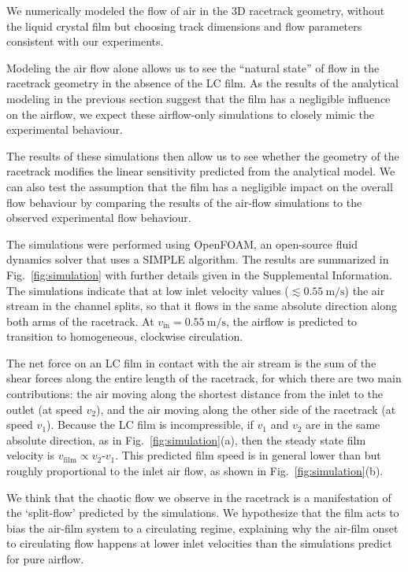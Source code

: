 \documentclass[aagreenthesis]{subfiles}
\begin{document}
We numerically
modeled the flow of air in the 3D racetrack geometry, without the liquid crystal
film but choosing track dimensions and flow parameters consistent with our
experiments.

  Modeling the air flow alone allows us to see the
     ``natural state'' of flow in the racetrack geometry in the absence of the
     LC film. As the results of the analytical modeling in the previous section
     suggest that the film has a negligible influence on the airflow,
     we expect these airflow-only simulations to closely mimic the experimental
     behaviour. 
     
     The results of these simulations then allow us to see whether the
     geometry of the racetrack modifies the linear sensitivity predicted from
     the analytical model. We can also test the
     assumption that the film has a negligible impact on the overall flow
     behaviour by comparing the results of the air-flow simulations to the observed experimental flow behaviour. 

The simulations were performed using OpenFOAM, an open-source fluid dynamics
solver that uses a SIMPLE
algorithm\cite{Wellertensorialapproachcomputational1998}.
The results are summarized in Fig.~\ref{fig:simulation} with further details given in
the Supplemental Information.
The simulations indicate that at low inlet velocity values ($\lesssim
\SI[per-mode=symbol]{0.55}{\meter\per\second}$) the air stream in the channel splits, so that it flows
in the same absolute direction along both arms of the racetrack.
At $v_\text{in}=\SI[per-mode=symbol]{0.55}{\meter\per\second}$, the airflow is predicted to
transition to homogeneous, clockwise circulation.

The net force on an LC film in contact with the air stream is the sum of the shear forces along the entire
length of the racetrack, for which there are two main contributions:
the air moving along the shortest distance from the inlet to the
outlet (at speed $v_2$), and the air moving along the other side of the
racetrack (at speed $v_1$). Because the LC film is incompressible, if
$v_1$ and $v_2$ are in the same absolute direction, as in Fig.~\ref{fig:simulation}(a), then the steady
state film velocity is $v_\text{film}\propto v_2$-$v_1$.
This predicted film speed is in general lower than but roughly proportional to the inlet air flow, as shown in
Fig.~\ref{fig:simulation}(b).

We think that the chaotic
flow we observe in the racetrack is a manifestation of the `split-flow'
predicted by the simulations.  We hypothesize that the film
acts to bias the air-film system to a circulating regime, explaining why the air-film onset
to circulating flow happens at lower inlet velocities than the simulations predict
for pure airflow.
\end{document}
